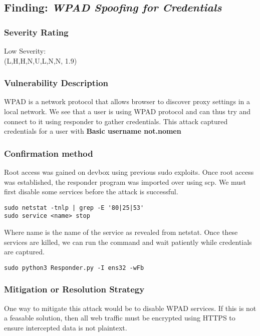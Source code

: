 \documentclass[notitlepage]{article}
\begin{document}

  \subsection{Finding: \emph{WPAD Spoofing for Credentials}}
  
	\subsubsection*{Severity Rating}
        Low Severity: \\
		\cvss(L,H,H,N,U,L,N,N, 1.9)
		
  	\subsubsection*{Vulnerability Description}
  		WPAD is a network protocol that allows browser to discover proxy settings in a local network. We see that a user is using WPAD protocol	and can thus 
        try and connect to it using responder to gather credentials. This attack captured credentials for a user with \textbf{Basic username {\:} not.nomen}
  	\subsubsection*{Confirmation method}
  	    Root access was gained on devbox using previous sudo exploits. Once root access was established, the responder program was imported over using scp.
        We must first disable some services before the attack is successful.
\begin{verbatim}
sudo netstat -tnlp | grep -E '80|25|53'
sudo service <name> stop
\end{verbatim}
    Where name is the name of the service as revealed from netstat. Once these services are killed, we can run the command and wait patiently while credentials are captured.
\begin{verbatim}
sudo python3 Responder.py -I ens32 -wFb
\end{verbatim}
				
    \subsubsection*{Mitigation or Resolution Strategy}
    One way to mitigate this attack would be to disable WPAD services. If this is not a feasable solution, then all web traffic must be encrypted using HTTPS to ensure
    intercepted data is not plaintext.
		
\end{document}
